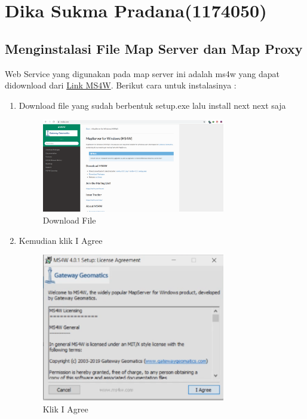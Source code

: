 \section{Dika Sukma Pradana(1174050)}
\subsection{Menginstalasi File Map Server dan Map Proxy}
Web Service yang digunakan pada map server ini adalah ms4w yang dapat didownload dari \href{https://ms4w.com/}{Link MS4W}.
Berikut cara untuk instalasinya : 
\begin{enumerate}
    \item Download file yang sudah berbentuk setup.exe lalu install next next saja
    \hfill\break
	\begin{figure}[H]
		\includegraphics[width=8cm]{figures/1174050/1174050/8.PNG}
		\centering
		\caption{Download File}
	\end{figure}
	
    \item Kemudian klik I Agree
    \hfill\break
	\begin{figure}[H]
		\includegraphics[width=8cm]{figures/1174050/1174050/1.PNG}
		\centering
		\caption{Klik I Agree}
	\end{figure}
	

\end{enumerate}
